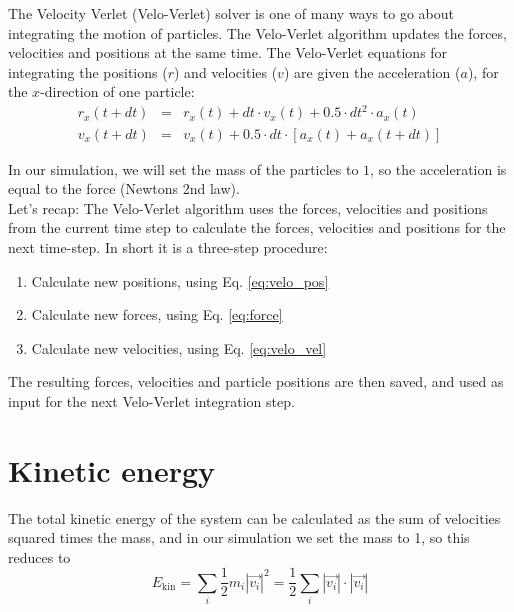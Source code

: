 \documentclass{article}
\begin{document}
The Velocity Verlet (Velo-Verlet) solver is one of many ways to go about integrating the motion of particles.
The Velo-Verlet algorithm updates the forces, velocities and positions at the same time.
The Velo-Verlet equations for integrating the positions ($r$) and velocities ($v$) are given the acceleration ($a$), for the $x$-direction of one particle:
\begin{eqnarray}
    r_x(t+dt)   &=& r_x(t) + dt \cdot v_x(t) + 0.5 \cdot dt^2 \cdot a_x(t) \label{eq:velo_pos} \\
    v_x(t + dt) &=& v_x(t) + 0.5 \cdot dt \cdot \left [ a_x(t) + a_x(t+dt) \right ] \label{eq:velo_vel}
\end{eqnarray}

In our simulation, we will set the mass of the particles to $1$, so the acceleration is equal to the force (Newtons 2nd law).\\

Let's recap: The Velo-Verlet algorithm uses the forces,
velocities and positions from the current time step to calculate the forces,
velocities and positions for the next time-step.
In short it is a three-step procedure:

\begin{enumerate}
    \item Calculate new positions, using Eq. \ref{eq:velo_pos}
    \item Calculate new forces, using Eq. \ref{eq:force}
    \item Calculate new velocities, using Eq. \ref{eq:velo_vel}
\end{enumerate}

The resulting forces, velocities and particle positions are then saved, and used as input for the next Velo-Verlet integration step.

\section{Kinetic energy}

The total kinetic energy of the system can be calculated as the sum of velocities squared times the mass, and in our simulation we set the mass to 1, so this reduces to
\begin{equation}
    E_{\mathrm{kin}} = \sum_i \frac{1}{2} m_i |\vec{v_i}|^2
= \frac{1}{2} \sum_i |\vec{v_i}| \cdot |\vec{v_i}|
\end{equation}
\end{document}
